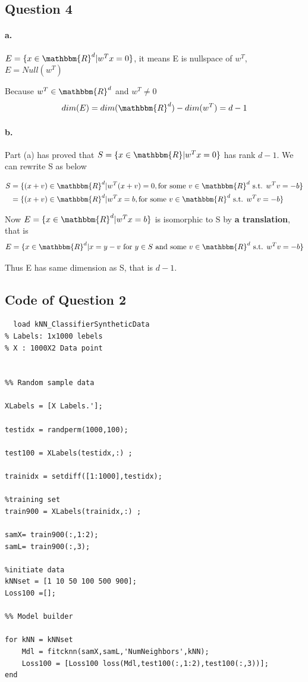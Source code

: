 \documentclass{article}
\begin{document}
\subsection*{ Question 4}
\paragraph{a.}
$  E = \{ x \in \mathbbm{R}^d | w^T x = 0\} $, it means E is nullspace of $w^T$, $E=Null(w^T)$

Because $w^T \in \mathbbm{R}^d$ and $ w^T \neq 0$
\begin{equation}
  dim(E) = dim( \mathbbm{R}^d ) - dim(w^T) = d - 1
\end{equation}

\paragraph{b.}
Part (a) has proved that $S = \{ x \in \mathbbm{R} | w^T x = 0\} $ has rank $d-1$.
We can rewrite S as below

\begin{equation}
  \begin{split}
    S &= \{ (x+v)\in \mathbbm{R}^d | w^T (x + v) = 0 , \text{for some } v \in \mathbbm{R}^d \text{ s.t. }  w^T v = - b    \}\\
    &= \{ (x+v)\in \mathbbm{R}^d | w^T x = b , \text{for some } v \in \mathbbm{R}^d \text{ s.t. }  w^T v = - b    \}
\end{split}
\end{equation}

Now $E = \{ x \in \mathbbm{R}^d | w^T x = b\}$ is isomorphic to S by \textbf{a translation}, that is
$$ E = \{x \in \mathbbm{R}^d | x = y - v \text{ for } y \in S \text{ and some } v \in \mathbbm{R}^d \text{ s.t. }  w^T v = - b  \}$$

Thus E has same dimension as S, that is $ d - 1$.

\subsection{Code of Question 2}
\begin{lstlisting}
  load kNN_ClassifierSyntheticData
% Labels: 1x1000 lebels
% X : 1000X2 Data point


%% Random sample data

XLabels = [X Labels.'];

testidx = randperm(1000,100);

test100 = XLabels(testidx,:) ;

trainidx = setdiff([1:1000],testidx);

%training set
train900 = XLabels(trainidx,:) ;

samX= train900(:,1:2);
samL= train900(:,3);

%initiate data
kNNset = [1 10 50 100 500 900];
Loss100 =[];

%% Model builder

for kNN = kNNset
    Mdl = fitcknn(samX,samL,'NumNeighbors',kNN);
    Loss100 = [Loss100 loss(Mdl,test100(:,1:2),test100(:,3))];
end
\end{lstlisting}
\end{document}
